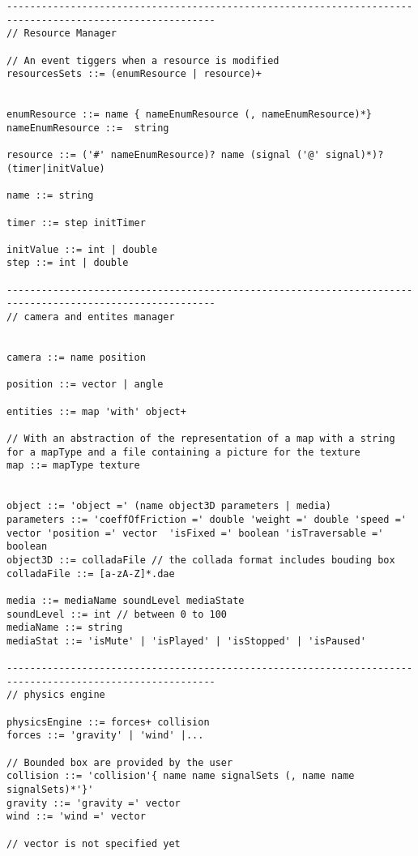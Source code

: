 \begin{lstlisting}[language=Grammar]
----------------------------------------------------------------------------------------------------------
// Resource Manager

// An event tiggers when a resource is modified
resourcesSets ::= (enumResource | resource)+


enumResource ::= name { nameEnumResource (, nameEnumResource)*}
nameEnumResource ::=  string

resource ::= ('#' nameEnumResource)? name (signal ('@' signal)*)? (timer|initValue)

name ::= string

timer ::= step initTimer

initValue ::= int | double
step ::= int | double

----------------------------------------------------------------------------------------------------------
// camera and entites manager


camera ::= name position

position ::= vector | angle

entities ::= map 'with' object+

// With an abstraction of the representation of a map with a string for a mapType and a file containing a picture for the texture
map ::= mapType texture


object ::= 'object =' (name object3D parameters | media)
parameters ::= 'coeffOfFriction =' double 'weight =' double 'speed =' vector 'position =' vector  'isFixed =' boolean 'isTraversable =' boolean
object3D ::= colladaFile // the collada format includes bouding box
colladaFile ::= [a-zA-Z]*.dae

media ::= mediaName soundLevel mediaState
soundLevel ::= int // between 0 to 100
mediaName ::= string
mediaStat ::= 'isMute' | 'isPlayed' | 'isStopped' | 'isPaused'

----------------------------------------------------------------------------------------------------------
// physics engine

physicsEngine ::= forces+ collision
forces ::= 'gravity' | 'wind' |...

// Bounded box are provided by the user
collision ::= 'collision'{ name name signalSets (, name name signalSets)*'}'
gravity ::= 'gravity =' vector
wind ::= 'wind =' vector

// vector is not specified yet

\end{lstlisting}
